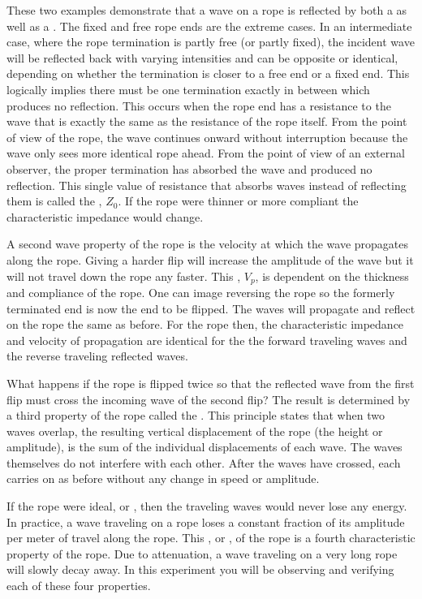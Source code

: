 \documentclass[12pt, a4paper, oneside, openright, titlepage]{book}
\begin{document}
\noindent These two examples demonstrate that a wave on a rope is reflected by both a  as well as a . The fixed and free rope ends are the extreme cases. In an intermediate case, where the rope termination is partly free (or partly fixed), the incident wave will be reflected back with varying intensities and can be opposite or identical, depending on whether the termination is closer to a free end or a fixed end. This logically implies there must be one termination exactly in between which produces no reflection. This  occurs when the rope end has a resistance to the wave that is exactly the same as the resistance of the rope itself. From the point of view of the rope, the wave continues onward without interruption because the wave only sees more identical rope ahead. From the point of view of an external observer, the proper termination has absorbed the wave and produced no reflection. This single value of resistance that absorbs waves instead of reflecting them is called the , $Z_0$. If the rope were thinner or more compliant the characteristic impedance would change.


\noindent A second wave property of the rope is the velocity at which the wave propagates along the rope. Giving a harder flip will increase the amplitude of the wave but it will not travel down the rope any faster. This , $V_p$, is dependent on the thickness and compliance of the rope. One can image reversing the rope so the formerly terminated end is now the end to be flipped. The waves will propagate and reflect on the rope the same as before. For the rope then, the characteristic impedance and velocity of propagation are identical for the the forward traveling waves and the reverse traveling reflected waves.

\noindent What happens if the rope is flipped twice so that the reflected wave from the first flip must cross the incoming wave of the second flip? The result is determined by a third property of the rope called the . This principle states that when two waves overlap, the resulting vertical displacement of the rope (the height or amplitude), is the sum of the individual displacements of each wave. The waves themselves do not interfere with each other. After the waves have crossed, each carries on as before without any change in speed or amplitude.

\noindent If the rope were ideal, or , then the traveling waves would never lose any energy. In practice, a wave traveling on a rope loses a constant fraction of its amplitude per meter of travel along the rope. This , or , of the rope is a fourth characteristic property of the rope. Due to attenuation, a wave traveling on a very long rope will slowly decay away. In this experiment you will be observing and verifying each of these four properties.
\end{document}
